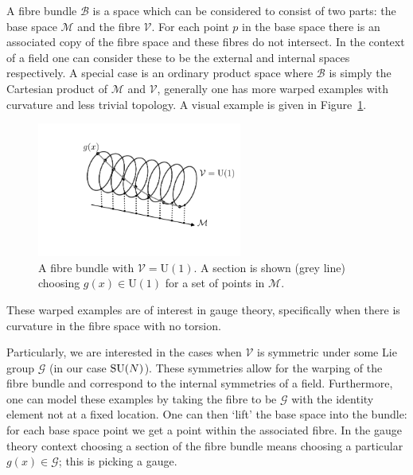 A fibre bundle $\mathcal{B}$ is a space which can be considered to consist of two parts: the base space $\mathcal{M}$ and the fibre $\mathcal{V}$. For each point $p$ in the base space there is an associated copy of the fibre space and these fibres do not intersect. 
In the context of a field one can consider these to be the external and internal spaces respectively. A special case is an ordinary product space where $\mathcal{B}$ is simply the Cartesian product of $\mathcal{M}$ and $\mathcal{V}$, generally one has more warped examples with curvature and less trivial topology. A visual example is given in Figure~\ref{fig:theory:fibre_bundle}.
\begin{figure}[h!]
    \centering
    \includegraphics[width=0.6\textwidth]{figures/theory/fibre_bundle.pdf}
    \caption{A fibre bundle with $\mathcal{V} = \mathrm{U}(1)$. A section is shown (grey line) choosing $g(x)\in\mathrm{U}(1)$ for a set of points in $\mathcal{M}$.}
    \label{fig:theory:fibre_bundle}
\end{figure}
These warped examples are of interest in gauge theory, specifically when there is curvature in the fibre space with no torsion.

Particularly, we are interested in the cases when $\mathcal{V}$ is symmetric under some Lie group $\mathcal{G}$ (in our case ${\mathrm{SU}(N)}$). 
These symmetries allow for the warping of the fibre bundle and correspond to the internal symmetries of a field. 
Furthermore, one can model these examples by taking the fibre to be $\mathcal{G}$ with the identity element not at a fixed location. 
One can then `lift' the base space into the bundle: for each base space point we get a point within the associated fibre. In the gauge theory context choosing a section of the fibre bundle means choosing a particular $g(x)\in\mathcal{G}$; this is picking a gauge. 

